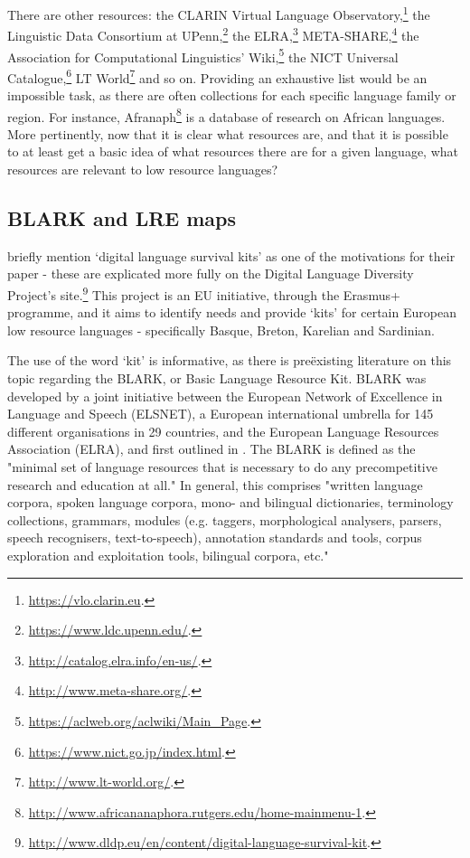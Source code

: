 There are other resources: the CLARIN Virtual Language Observatory,\footnote{\href{https://vlo.clarin.eu}{https://vlo.clarin.eu}. } the Linguistic Data Consortium at UPenn,\footnote{\href{https://www.ldc.upenn.edu/}{https://www.ldc.upenn.edu/}. } the ELRA,\footnote{\href{http://catalog.elra.info/en-us/}{http://catalog.elra.info/en-us/}. } META-SHARE,\footnote{\href{http://www.meta-share.org/}{http://www.meta-share.org/}. } the Association for Computational Linguistics' Wiki,\footnote{\href{https://aclweb.org/aclwiki/Main_Page}{https://aclweb.org/aclwiki/Main\_Page}. } the NICT Universal Catalogue,\footnote{\href{https://www.nict.go.jp/index.html}{https://www.nict.go.jp/index.html}. } LT World\footnote{\href{http://www.lt-world.org/}{http://www.lt-world.org/}. } and so on. Providing an exhaustive list would be an impossible task, as there are often collections for each specific language family or region. For instance, Afranaph\footnote{\href{http://www.africananaphora.rutgers.edu/home-mainmenu-1}{http://www.africananaphora.rutgers.edu/home-mainmenu-1}. } is a database of research on African languages. More pertinently, now that it is clear what resources are, and that it is possible to at least get a basic idea of what resources there are for a given language, what resources are relevant to low resource languages?

\subsection{BLARK and LRE maps}
\label{subsec:blark-and-lre-maps}

\citet{soria2017digital} briefly mention `digital language survival kits' as one of the motivations for their paper - these are explicated more fully on the Digital Language Diversity Project's site.\footnote{\href{http://www.dldp.eu/en/content/digital-language-survival-kit}{http://www.dldp.eu/en/content/digital-language-survival-kit}. } This project is an EU initiative, through the Erasmus+ programme, and it aims to identify needs and provide `kits' for certain European low resource languages - specifically Basque, Breton, Karelian and Sardinian.

The use of the word `kit' is informative, as there is  pre\"{e}xisting literature on this topic regarding the BLARK, or Basic Language Resource Kit. BLARK was developed by a joint initiative between the European Network of Excellence in Language and Speech (ELSNET), a European international umbrella for 145 different organisations in 29 countries, and the European Language Resources Association (ELRA), and first outlined in \citet{krauwer1998elsnet}. The BLARK is defined as the "minimal set of language resources that is necessary to do any precompetitive research and education at all." \citep[4]{krauwer2003basic} In general, this comprises "written language corpora, spoken language corpora, mono- and bilingual dictionaries, terminology collections, grammars, modules (e.g. taggers, morphological analysers, parsers, speech recognisers, text-to-speech), annotation standards and tools, corpus exploration and exploitation tools, bilingual corpora, etc."

